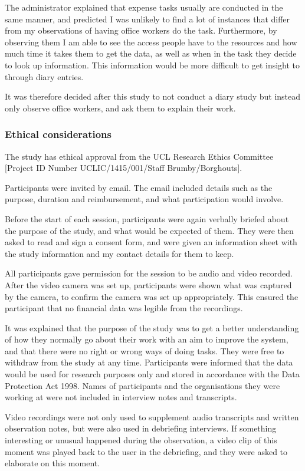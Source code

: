 The administrator explained that expense tasks usually are conducted in the same manner, and predicted I was unlikely to find a lot of instances that differ from my observations of having office workers do the task.
Furthermore, by observing them I am able to see the access people have to the resources and how much time it takes them to get the data, as well as when in the task they decide to look up information. This information would be more difficult to get insight to through diary entries.

It was therefore decided after this study to not conduct a diary study but instead only observe office workers, and ask them to explain their work.

\subsubsection{Ethical considerations}
The study has ethical approval from the UCL Research Ethics Committee [Project ID Number UCLIC/1415/001/Staff Brumby/Borghouts]. 

Participants were invited by email. The email included details such as the purpose, duration and reimbursement, and what participation would involve. 

Before the start of each session, participants were again verbally briefed about the purpose of the study, and what would be expected of them. They were then asked to read and sign a consent form, and were given an information sheet with the study information and my contact details for them to keep. 

All participants gave permission for the session to be audio and video recorded. After the video camera was set up, participants were shown what was captured by the camera, to confirm the camera was set up appropriately. This ensured the participant that no financial data was legible from the recordings.

It was explained that the purpose of the study was to get a better understanding of how they normally go about their work with an aim to improve the system, and that there were no right or wrong ways of doing tasks. They were free to withdraw from the study at any time.
Participants were informed that the data would be used for research purposes only and stored in accordance with the Data Protection Act 1998. Names of participants and the organisations they were working at were not included in interview notes and transcripts.

Video recordings were not only used to supplement audio transcripts and written observation notes, but were also used in debriefing interviews.
If something interesting or unusual happened during the observation, a video clip of this moment was played back to the user in the debriefing, and they were asked to elaborate on this moment.

